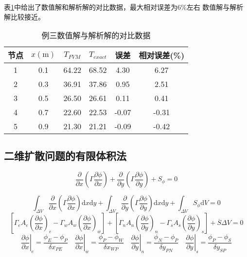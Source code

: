 表\ref{TbFV_ex3_compare}中给出了数值解和解析解的对比数据，最大相对误差为6\%左右
数值解与解析解比较接近。
\begin{table}[H]
  \begin{center}
  \caption{例三数值解与解析解的对比数据}
  \label{TbFV_ex3_compare}
  \begin{tabular}{|c|c|c|c|c|c|}
    \hline
    节点 & $x(\mathrm{m})$ & $T_{FVM}$ & $T_{exact}$ & 误差 & 相对误差(\%) \\
    \hline
    1 & 0.1 & 64.22 & 68.52 & 4.30 & 6.27 \\
    \hline
    2 & 0.3 & 36.91 & 37.86 & 0.95 & 2.51 \\
    \hline
    3 & 0.5 & 26.50 & 26.61 & 0.11 & 0.41 \\
    \hline
    4 & 0.7 & 22.60 & 22.53 & -0.07 & -0.31 \\
    \hline
    5 & 0.9 & 21.30 & 21.21 & -0.09 & -0.42 \\
    \hline
  \end{tabular}
  \end{center}
\end{table}

\subsection{二维扩散问题的有限体积法}
\begin{equation}
\frac{\partial }{\partial x}
\left(
\Gamma \frac{\partial \phi}{\partial x}
\right)
+
\frac{\partial }{\partial y}
\left(
\Gamma \frac{\partial \phi}{\partial y}
\right)
+
S_{\phi}
=
0
\end{equation}

\begin{equation}
  \int_{\Delta V}\!
\frac{\partial }{\partial x}
\left(
\Gamma \frac{\partial \phi}{\partial x}
\right)
\mathrm{d}x\mathrm{d}y
+
  \int_{\Delta V}\!
\frac{\partial }{\partial y}
\left(
\Gamma \frac{\partial \phi}{\partial y}
\right)
\mathrm{d}x\mathrm{d}y
+
  \int_{\Delta V}\!
S_{\phi}
\mathrm{d}V
=
0
\end{equation}
\begin{equation}
  \left[
    \Gamma_{e} A_{e}
    \left(
      \frac{\partial \phi}{\partial x}
    \right)_{e}
    -
    \Gamma_{w} A_{w}
    \left(
      \frac{\partial \phi}{\partial x}
    \right)_{w}
  \right]
  +
  \left[
    \Gamma_{n} A_{n}
    \left(
      \frac{\partial \phi}{\partial y}
    \right)_{n}
    -
    \Gamma_{s} A_{s}
    \left(
      \frac{\partial \phi}{\partial y}
    \right)_{s}
  \right]
  +
  \overline{S}\Delta V
  =
  0
\end{equation}
\begin{equation}
  \left.\frac{\partial \phi}{\partial x}\right|_{e}=\frac{\phi_{E}-\phi_{P}}{\delta x_{PE}} 
    \quad
  \left.\frac{\partial \phi}{\partial x}\right|_{w}=\frac{\phi_{P}-\phi_{W}}{\delta x_{WP}} 
    \quad
  \left.\frac{\partial \phi}{\partial y}\right|_{n}=\frac{\phi_{N}-\phi_{P}}{\delta y_{PN}} 
    \quad
  \left.\frac{\partial \phi}{\partial y}\right|_{s}=\frac{\phi_{P}-\phi_{S}}{\delta y_{SP}} 
\end{equation}

